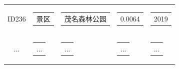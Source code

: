 \documentclass[bwprint]{gmcmthesis}
\begin{document}
\begin{center}
\begin{longtable}{c|c|c|c|c}
        ID236 & \begin{tabular}[c]{@{}c@{}}
          景区
          \end{tabular} 
          & \begin{tabular}[c]{@{}l@{}}
            茂名森林公园
          \end{tabular} 
          & \begin{tabular}[c]{@{}c@{}}
            0.0064
            \end{tabular}
            & \begin{tabular}[c]{@{}c@{}}
              2019
              \end{tabular}\\
          ... & \begin{tabular}[c]{@{}c@{}}
            ...
          \end{tabular} 
          & \begin{tabular}[c]{@{}l@{}}
            ...
          \end{tabular} 
          & \begin{tabular}[c]{@{}c@{}}
            ...
          \end{tabular} 
          & \begin{tabular}[c]{@{}c@{}}
            ...
          \end{tabular} \\


\end{longtable}
\end{center}
\end{document}
